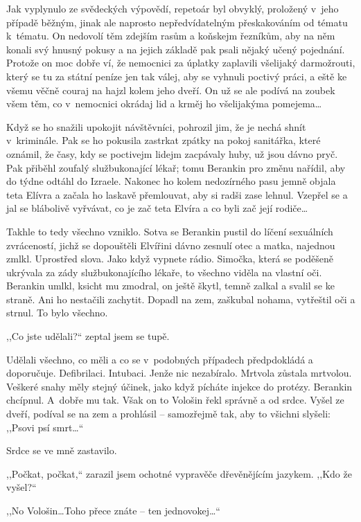 Jak vyplynulo ze svědeckých výpovědí, repetoár byl obvyklý, proložený v~jeho případě běžným, jinak ale naprosto nepředvídatelným přeskakováním od tématu k~tématu. On nedovolí těm zdejším rasům a koňskejm řezníkům, aby na něm konali svý hnusný pokusy a na jejich základě pak psali nějaký učený pojednání. Protože on moc dobře ví, že nemocnici za úplatky zaplavili všelijaký darmožrouti, který se tu za státní peníze jen tak válej, aby se vyhnuli poctivý práci, a eště ke všemu věčně couraj na hajzl kolem jeho dveří. On už se ale podívá na zoubek všem těm, co v~nemocnici okrádaj lid a krměj ho všelijakýma pomejema\ldots

Když se ho snažili upokojit návštěvníci, pohrozil jim, že je nechá shnít v~kriminále. Pak se ho pokusila zastrkat zpátky na pokoj sanitářka, které oznámil, že časy, kdy se poctivejm lidejm zacpávaly huby, už jsou dávno pryč. Pak přiběhl zoufalý službukonající lékař; tomu Berankin pro změnu nařídil, aby do týdne odtáhl do Izraele. Nakonec ho kolem nedozírného pasu jemně objala teta Elívra a začala ho laskavě přemlouvat, aby si radši zase lehnul. Vzepřel se a jal se blábolivě vyřvávat, co je zač teta Elvíra a co byli zač její rodiče\ldots

Takhle to tedy všechno vzniklo. Sotva se Berankin pustil do líčení sexuálních zvráceností, jichž se dopouštěli Elvířini dávno zesnulí otec a matka, najednou zmlkl. Uprostřed slova. Jako když vypnete rádio. Simočka, která se poděšeně ukrývala za zády službukonajícího lékaře, to všechno viděla na vlastní oči. Berankin umlkl, ksicht mu zmodral, on ještě škytl, temně zalkal a svalil se ke straně. Ani ho nestačili zachytit. Dopadl na zem, zaškubal nohama, vytřeštil oči a strnul. To bylo všechno.

,,Co jste udělali?“ zeptal jsem se tupě.

Udělali všechno, co měli a co se v~podobných případech předpdokládá a doporučuje. Defibrilaci. Intubaci. Jenže nic nezabíralo. Mrtvola zůstala mrtvolou. Veškeré snahy měly stejný účinek, jako když pícháte injekce do protézy. Berankin chcípnul. A~dobře mu tak. Však on to Vološin řekl správně a od srdce. Vyšel ze dveří, podíval se na zem a prohlásil – samozřejmě tak, aby to všichni slyšeli: ,,Psovi psí smrt\ldots“

Srdce se ve mně zastavilo.

,,Počkat, počkat,“ zarazil jsem ochotné vypravěče dřevěnějícím jazykem. ,,Kdo že vyšel?“

,,No Vološin\ldots Toho přece znáte – ten jednovokej\ldots“

